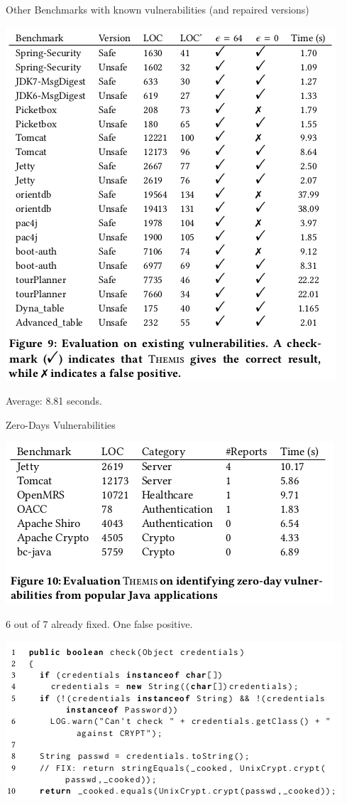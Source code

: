 \documentclass[page number]{beamer}
\begin{document}
\begin{frame}{Other Benchmarks with known vulnerabilities (and repaired versions)}
 \begin{center}
    \includegraphics[scale=0.36]{img_chen/9.png}
  \end{center}
 Average: 8.81 seconds.
\end{frame}

\begin{frame}{Zero-Days Vulnerabilities}
  \begin{center}
    \includegraphics[scale=0.4]{img_chen/10.png}
  \end{center}
  6 out of 7 already fixed. One false positive.
  \begin{center}
    \includegraphics[scale=0.4]{img_chen/11.png}
  \end{center}
\end{frame}
\end{document}
